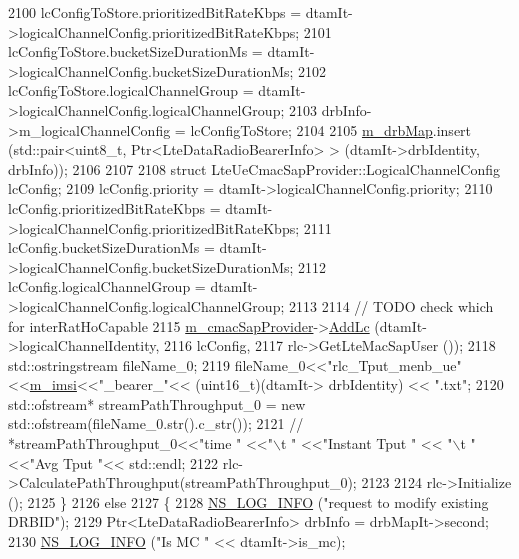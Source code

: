 \begin{DoxyCode}
2100           lcConfigToStore.prioritizedBitRateKbps = dtamIt->logicalChannelConfig.prioritizedBitRateKbps;
2101           lcConfigToStore.bucketSizeDurationMs = dtamIt->logicalChannelConfig.bucketSizeDurationMs;
2102           lcConfigToStore.logicalChannelGroup = dtamIt->logicalChannelConfig.logicalChannelGroup;
2103           drbInfo->m\_logicalChannelConfig = lcConfigToStore;
2104   
2105           \hyperlink{classns3_1_1LteUeRrc_aa85c5bdde73c2072b2b3053e629bdce0}{m\_drbMap}.insert (std::pair<uint8\_t, Ptr<LteDataRadioBearerInfo> > (dtamIt->drbIdentity, 
      drbInfo));
2106   
2107 
2108           \textcolor{keyword}{struct }LteUeCmacSapProvider::LogicalChannelConfig lcConfig;
2109           lcConfig.priority = dtamIt->logicalChannelConfig.priority;
2110           lcConfig.prioritizedBitRateKbps = dtamIt->logicalChannelConfig.prioritizedBitRateKbps;
2111           lcConfig.bucketSizeDurationMs = dtamIt->logicalChannelConfig.bucketSizeDurationMs;
2112           lcConfig.logicalChannelGroup = dtamIt->logicalChannelConfig.logicalChannelGroup;
2113 
2114           \textcolor{comment}{// TODO check which for interRatHoCapable}
2115           \hyperlink{classns3_1_1LteUeRrc_a5a7bffd2040d73eb5db1aaef849d0396}{m\_cmacSapProvider}->\hyperlink{classns3_1_1LteUeCmacSapProvider_a62f2d731c336ca14e98e95a3215e92ec}{AddLc} (dtamIt->logicalChannelIdentity,
2116                                     lcConfig,
2117                                     rlc->GetLteMacSapUser ());
2118           std::ostringstream fileName\_0;
2119                       fileName\_0<<\textcolor{stringliteral}{"rlc\_Tput\_menb\_ue"}<<\hyperlink{classns3_1_1LteUeRrc_a1d825677309d17bdf729920f7dafd011}{m\_imsi}<<\textcolor{stringliteral}{"\_bearer\_"}<< (uint16\_t)(dtamIt->
      drbIdentity) << \textcolor{stringliteral}{".txt"};
2120                       std::ofstream* streamPathThroughput\_0 = \textcolor{keyword}{new} std::ofstream(fileName\_0.str().c\_str());
2121                      \textcolor{comment}{// *streamPathThroughput\_0<<"time " <<"\(\backslash\)t " <<"Instant Tput " << "\(\backslash\)t " <<"Avg Tput "<<
       std::endl;}
2122                       rlc->CalculatePathThroughput(streamPathThroughput\_0);
2123 
2124           rlc->Initialize ();
2125         \}
2126       \textcolor{keywordflow}{else}
2127         \{
2128           \hyperlink{group__logging_gafbd73ee2cf9f26b319f49086d8e860fb}{NS\_LOG\_INFO} (\textcolor{stringliteral}{"request to modify existing DRBID"});
2129           Ptr<LteDataRadioBearerInfo> drbInfo = drbMapIt->second;
2130           \hyperlink{group__logging_gafbd73ee2cf9f26b319f49086d8e860fb}{NS\_LOG\_INFO} (\textcolor{stringliteral}{"Is MC "} << dtamIt->is\_mc);

\end{DoxyCode}
